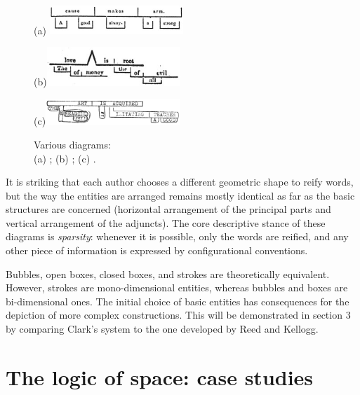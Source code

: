 \documentclass[output=paper]{langsci/langscibook}
\begin{document}
 \begin{figure}
    
     \centering
     (a) \includegraphics[width=0.45\textwidth]{figures/04/Kap.4.img.0004a.jpg}
     
     (b)\includegraphics[width=0.45\textwidth]{figures/04/Kap.4.img.0004b.jpg}
    
     (c)\includegraphics[width=0.45\textwidth]{figures/04/Kap.4.img.0004c.png}
     
    \caption{Various diagrams:\\
    (a) \citet[265]{burtt_practical_1869}; (b) \citet[153]{chandler__class_1862}; (c) \citet[50]{lighthall_introduction_1872}.}
    \label{fig:4}
    
 \end{figure}

It is striking that each author chooses a different geometric shape to reify words, but the way the entities are arranged remains mostly identical as far as the basic structures are concerned (horizontal arrangement of the principal parts and vertical arrangement of the adjuncts). The core descriptive stance of these diagrams is \textit{sparsity}: whenever it is possible, only the words are reified, and any other piece of information is expressed by configurational conventions.

Bubbles, open boxes, closed boxes, and strokes are theoretically equivalent. However, strokes are mono-dimensional entities, whereas bubbles and boxes are bi-dimensional ones. The initial choice of basic entities has consequences for the depiction of more complex constructions. This will be demonstrated in section 3 by comparing Clark’s system to the one developed by Reed and Kellogg.

\section{The logic of space: case studies}
\end{document}
